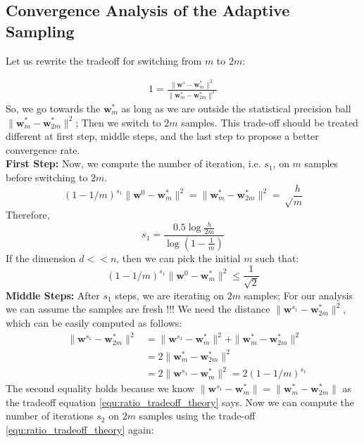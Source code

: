 \documentclass[11pt, a4paper, reqno, twoside]{scrartcl}
\theoremstyle{style}
\newcommand{\wv}{\bm{w}}
\newcommand{\0}{\mathbf{0}} %
\begin{document}
\subsection{Convergence Analysis of the Adaptive Sampling}
Let us rewrite the tradeoff
\label{eqn:tradeoff} for switching from $m$ to $2 m$: 

\begin{eqnarray}
 1 = \frac{\|\wv^s -
\wv_m^*\|^2}{\|\wv_m^* - \wv_{2m}^* \|^2}
\end{eqnarray} 
So, we go towards the $\wv_m^*$
as long as we are outside the statistical precision ball $\|\wv_m^* - \wv_{2m}^*
\|^2$; Then we switch to $2m$ samples. This trade-off should be treated
different at first step, middle steps, and the last step to propose a better
convergence rate.\\
\textbf{First Step:} Now, we compute the number of iteration, i.e. $s_1$, on
 $m$ samples before switching to $2m$.
 \begin{equation*}
	(1-1/m)^{s_1} \| \wv^0 - \wv_m^* \|^2 = \| \wv_m^* - \wv^*_{2m} \|^2 = \sqrt
	 \frac{h}{ m}
\end{equation*} 
Therefore,
 \begin{equation}
 	s_1 = \frac{0.5 \log \frac{h}{2m}}{\log(1-\frac{1}{m})} \nonumber
 \end{equation}
If the dimension $d << n$, then we can pick the initial $m$ such that: 
\begin{equation}
	(1-1/m)^{s_1} \|\wv^0 - \wv_m^*\|^2 \leq \frac{1}{\sqrt{2}}
	\label{eqn:first_step}
\end{equation}
\textbf{Middle Steps:} After $s_1$ steps, we are iterating on $2m$ samples; For
our analysis we can assume the samples are fresh !!! We need the distance
$\| \wv^{s_1} - \wv_{2m}^* \|^2$, which can be easily computed as follows:
\begin{eqnarray}
	& \| \wv^{s_1} - \wv_{2m}^* \|^2 & = \| \wv^{s_1} - \wv_{m}^* \|^2 + \|
	\wv_{m}^* - \wv_{2m}^* \|^2 \nonumber \\ 
	& & = 2 \| \wv_m^* - \wv_{2m}^* \|^2 \label{eqn:statistical_convergence} \\ 
	& & = 2 \| \wv^{s_1} - \wv^*_{m} \|^2 = 2 (1-1/m)^{s_1}
	\label{eqn:geometrical_convergenc}
\end{eqnarray}
The second equality holds because we know $\|\wv^{s_1} - \wv_{m}^*\| = \|
\wv_{m}^* - \wv_{2m}^* \|$ as the tradeoff equation
\ref{equ:ratio_tradeoff_theory} says. Now we can compute the number of
iterations $s_2$ on $2m$ samples using the trade-off
\ref{equ:ratio_tradeoff_theory} again:
\end{document}
